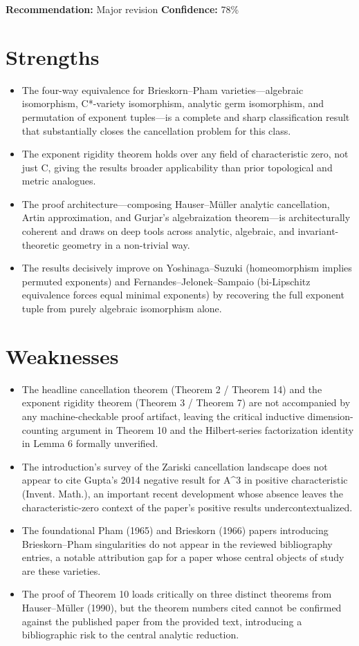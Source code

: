 \documentclass[11pt]{article}
\begin{document}
\textbf{Recommendation:} Major revision \quad \textbf{Confidence:} 78\%\\

\section*{Strengths}
\begin{itemize}[leftmargin=*]
  \item The four-way equivalence for Brieskorn--Pham varieties---algebraic isomorphism, C*-variety isomorphism, analytic germ isomorphism, and permutation of exponent tuples---is a complete and sharp classification result that substantially closes the cancellation problem for this class.
  \item The exponent rigidity theorem holds over any field of characteristic zero, not just C, giving the results broader applicability than prior topological and metric analogues.
  \item The proof architecture---composing Hauser--Müller analytic cancellation, Artin approximation, and Gurjar's algebraization theorem---is architecturally coherent and draws on deep tools across analytic, algebraic, and invariant-theoretic geometry in a non-trivial way.
  \item The results decisively improve on Yoshinaga--Suzuki (homeomorphism implies permuted exponents) and Fernandes--Jelonek--Sampaio (bi-Lipschitz equivalence forces equal minimal exponents) by recovering the full exponent tuple from purely algebraic isomorphism alone.
\end{itemize}

\section*{Weaknesses}
\begin{itemize}[leftmargin=*]
  \item The headline cancellation theorem (Theorem 2 / Theorem 14) and the exponent rigidity theorem (Theorem 3 / Theorem 7) are not accompanied by any machine-checkable proof artifact, leaving the critical inductive dimension-counting argument in Theorem 10 and the Hilbert-series factorization identity in Lemma 6 formally unverified.
  \item The introduction's survey of the Zariski cancellation landscape does not appear to cite Gupta's 2014 negative result for A\^{}3 in positive characteristic (Invent. Math.), an important recent development whose absence leaves the characteristic-zero context of the paper's positive results undercontextualized.
  \item The foundational Pham (1965) and Brieskorn (1966) papers introducing Brieskorn--Pham singularities do not appear in the reviewed bibliography entries, a notable attribution gap for a paper whose central objects of study are these varieties.
  \item The proof of Theorem 10 loads critically on three distinct theorems from Hauser--Müller (1990), but the theorem numbers cited cannot be confirmed against the published paper from the provided text, introducing a bibliographic risk to the central analytic reduction.
\end{itemize}
\end{document}

